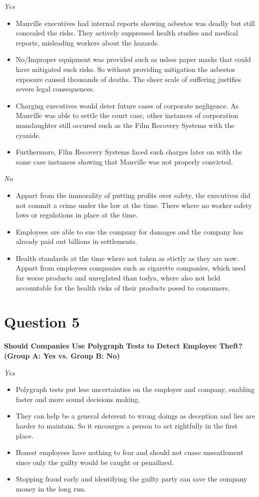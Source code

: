 \documentclass{article}
\begin{document}
\textit{Yes}
\begin{itemize}
    \item Manville executives had internal reports showing asbestos was deadly but still concealed the risks. They actively suppressed health studies and medical reports, misleading workers about the hazards.
    \item No/Improper equipment was provided such as usless paper masks that could have mitigated such risks. So without providing mitigation the asbestos exposure caused thousands of deaths. The sheer scale of suffering justifies severe legal consequences.
    \item Charging executives would deter future cases of corporate negligence. As Manville was able to settle the court case, other instances of corporation manslaughter still occured such as the Film Recovery Systems with the cyanide.
    \item Furthermore, Film Recovery Systems faced such charges later on with the same case instances showing that Manville was not properly convicted.
\end{itemize}


\textit{No}
\begin{itemize}
    \item Appart from the immorality of putting profits over safety, the executives did not commit a crime under the law at the time. There where no worker safety laws or regulations in place at the time.
    \item Employees are able to sue the company for damages and the company has already paid out billions in settlements.
    \item Health standards at the time where not taken as stictly as they are now. Appart from employees companies such as cigarette companies, which 
    used far worse products and unreglated than todya, where also not held accountable for the health risks of their products posed to consumers.
\end{itemize}

\section*{Question 5}
\textbf{Should Companies Use Polygraph Tests to Detect Employee Theft? (Group A: Yes vs. Group B: No)}

\textit{Yes}
\begin{itemize}
    \item Polygraph tests put less uncertainties on the employer and company, enabling faster and more sound decisions making.
    \item They can help be a general deterent to wrong doings as deception and lies are harder to maintain. So it encourges a person to act rightfully in the first place.
    \item Honest employees have nothing to fear and should not cuase unseatlement since only the guilty would be caught or penailized.
    \item Stopping fraud early and identifying the guilty party can save the company money in the long run.
\end {itemize}
\end{document}
